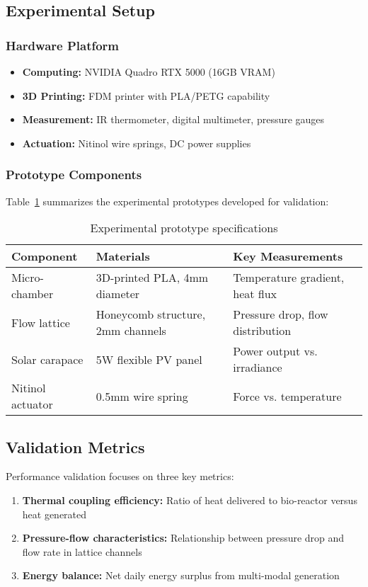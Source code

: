\subsection{Experimental Setup}

\subsubsection{Hardware Platform}
\begin{itemize}
    \item \textbf{Computing:} NVIDIA Quadro RTX 5000 (16GB VRAM)
    \item \textbf{3D Printing:} FDM printer with PLA/PETG capability
    \item \textbf{Measurement:} IR thermometer, digital multimeter, pressure gauges
    \item \textbf{Actuation:} Nitinol wire springs, DC power supplies
\end{itemize}

\subsubsection{Prototype Components}

Table~\ref{tab:prototypes} summarizes the experimental prototypes developed for validation:

\begin{table}[H]
\centering
\caption{Experimental prototype specifications}
\label{tab:prototypes}
\begin{tabular}{@{}lll@{}}
\toprule
Component & Materials & Key Measurements \\
\midrule
Micro-chamber & 3D-printed PLA, 4mm diameter & Temperature gradient, heat flux \\
Flow lattice & Honeycomb structure, 2mm channels & Pressure drop, flow distribution \\
Solar carapace & 5W flexible PV panel & Power output vs. irradiance \\
Nitinol actuator & 0.5mm wire spring & Force vs. temperature \\
\bottomrule
\end{tabular}
\end{table}

\subsection{Validation Metrics}

Performance validation focuses on three key metrics:
\begin{enumerate}
    \item \textbf{Thermal coupling efficiency:} Ratio of heat delivered to bio-reactor versus heat generated
    \item \textbf{Pressure-flow characteristics:} Relationship between pressure drop and flow rate in lattice channels
    \item \textbf{Energy balance:} Net daily energy surplus from multi-modal generation
\end{enumerate}